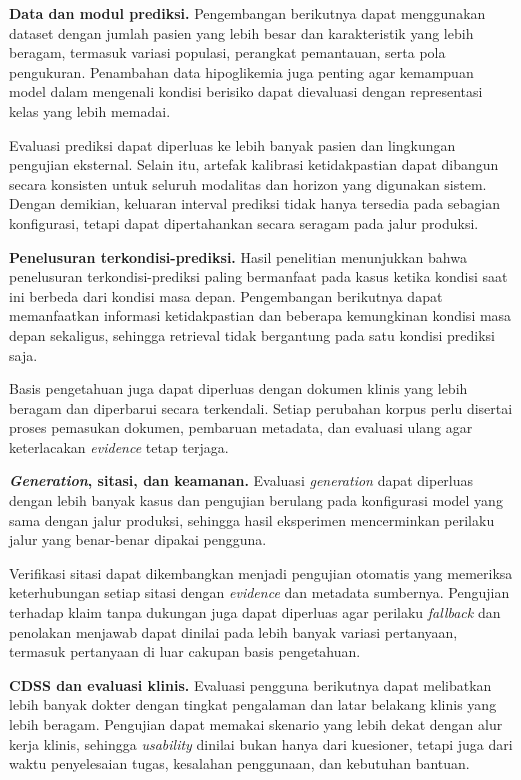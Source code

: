 \textbf{Data dan modul prediksi.} Pengembangan berikutnya dapat menggunakan dataset dengan jumlah pasien yang lebih besar dan karakteristik yang lebih beragam, termasuk variasi
populasi, perangkat pemantauan, serta pola pengukuran. Penambahan data hipoglikemia juga penting agar kemampuan model dalam mengenali kondisi berisiko
dapat dievaluasi dengan representasi kelas yang lebih memadai.

Evaluasi prediksi dapat diperluas ke lebih banyak pasien dan lingkungan pengujian eksternal. Selain itu, artefak kalibrasi ketidakpastian dapat dibangun
secara konsisten untuk seluruh modalitas dan horizon yang digunakan sistem. Dengan demikian, keluaran interval prediksi tidak hanya tersedia pada
sebagian konfigurasi, tetapi dapat dipertahankan secara seragam pada jalur produksi.

\textbf{Penelusuran terkondisi-prediksi.} Hasil penelitian menunjukkan bahwa penelusuran terkondisi-prediksi paling bermanfaat pada kasus ketika kondisi saat ini berbeda dari kondisi masa
depan. Pengembangan berikutnya dapat memanfaatkan informasi ketidakpastian dan beberapa kemungkinan kondisi masa depan sekaligus, sehingga retrieval tidak
bergantung pada satu kondisi prediksi saja.

Basis pengetahuan juga dapat diperluas dengan dokumen klinis yang lebih beragam dan diperbarui secara terkendali. Setiap perubahan korpus perlu disertai
proses pemasukan dokumen, pembaruan metadata, dan evaluasi ulang agar keterlacakan \textit{evidence} tetap terjaga.

\textbf{\textit{Generation}, sitasi, dan keamanan.} Evaluasi \textit{generation} dapat diperluas dengan lebih banyak kasus dan pengujian berulang pada
konfigurasi model yang sama dengan jalur produksi, sehingga hasil eksperimen mencerminkan perilaku jalur yang benar-benar dipakai pengguna.

Verifikasi sitasi dapat dikembangkan menjadi pengujian otomatis yang memeriksa keterhubungan setiap sitasi dengan \textit{evidence} dan metadata sumbernya.
Pengujian terhadap klaim tanpa dukungan juga dapat diperluas agar perilaku \textit{fallback} dan penolakan menjawab dapat dinilai pada lebih banyak
variasi pertanyaan, termasuk pertanyaan di luar cakupan basis pengetahuan.

\textbf{CDSS dan evaluasi klinis.} Evaluasi pengguna berikutnya dapat melibatkan lebih banyak dokter dengan tingkat pengalaman dan latar belakang klinis yang lebih beragam. Pengujian
dapat memakai skenario yang lebih dekat dengan alur kerja klinis, sehingga \textit{usability} dinilai bukan hanya dari kuesioner, tetapi juga dari waktu
penyelesaian tugas, kesalahan penggunaan, dan kebutuhan bantuan.

